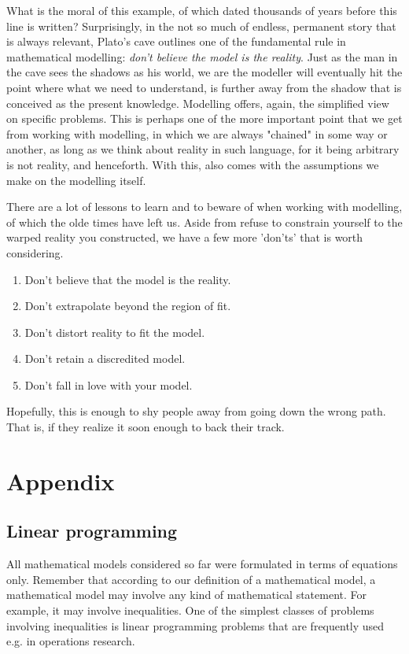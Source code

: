 What is the moral of this example, of which dated thousands of years before this line is written? Surprisingly, in the not so much of endless, permanent story that is always relevant, Plato's cave outlines one of the fundamental rule in mathematical modelling: \textit{don't believe the model is the reality}. Just as the man in the cave sees the shadows as his world, we are the modeller will eventually hit the point where what we need to understand, is further away from the shadow that is conceived as the present knowledge. Modelling offers, again, the simplified view on specific problems. This is perhaps one of the more important point that we get from working with modelling, in which we are always "chained" in some way or another, as long as we think about reality in such language, for it being arbitrary is not reality, and henceforth. With this, also comes with the assumptions we make on the modelling itself. 

There are a lot of lessons to learn and to beware of when working with modelling, of which the olde times have left us. Aside from refuse to constrain yourself to the warped reality you constructed, we have a few more 'don'ts' that is worth considering. 
\begin{axiom}
\vspace{1mm}

    \begin{enumerate}[topsep=0pt,itemsep=1pt]
        \item Don't believe that the model is the reality. 
        \item Don't extrapolate beyond the region of fit. 
        \item Don't distort reality to fit the model. 
        \item Don't retain a discredited model. 
        \item Don't fall in love with your model. 
    \end{enumerate}
\end{axiom}
Hopefully, this is enough to shy people away from going down the wrong path. That is, if they realize it soon enough to back their track. 

\section{Appendix}
\subsection{Linear programming}
All mathematical models considered so far were formulated in terms of equations only. Remember that according to our definition of a mathematical model, a mathematical model may involve any kind of mathematical statement. For example, it may involve inequalities. One of the simplest classes of problems involving inequalities is linear programming problems that are frequently used e.g. in operations research.

